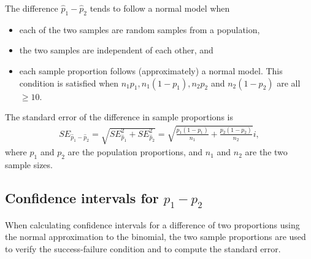 \begin{termBox}{
The difference $\hat{p}_1 - \hat{p}_2$ tends to follow a normal model when
\begin{itemize}
\setlength{\itemsep}{0mm}
\item each of the two samples are random samples from a population,
\item the two samples are independent of each other, and
\item each sample proportion follows (approximately) a normal model. This condition is satisfied when $n_1p_1, n_1(1 - p_1), n_2 p_2$ and $n_2(1 - p_2)$ are all $\geq 10$.
\end{itemize}
The standard error of the difference in sample proportions is
\begin{eqnarray}
SE_{\hat{p}_1 - \hat{p}_2}
	= \sqrt{SE_{\hat{p}_1}^2 + SE_{\hat{p}_2}^2}
	= \sqrt{\frac{p_1(1-p_1)}{n_1} + \frac{p_2(1-p_2)}{n_2}}i,
\label{seForDiffOfProp}
\end{eqnarray}
where $p_1$ and $p_2$ are the population proportions, and $n_1$ and $n_2$ are the two sample sizes.}
\end{termBox}


\subsection{Confidence intervals for $p_1 - p_2$}

When calculating confidence intervals for a difference of two proportions using the normal approximation to the binomial, the two sample proportions are used to verify the success-failure condition and to compute the standard error.

